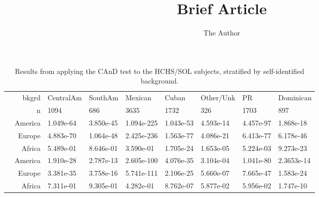 \documentclass[11pt]{article} %
\title{Brief Article}
\author{The Author}
\begin{document}
\begin{table}[ht]
\centering
\begin{tabular}{rr|lllllll}
  \hline
 &bkgrd & CentralAm & SouthAm & Mexican & Cuban & Other/Unk & PR & Dominican \\ 
  &n & 1094 &  686 & 3635 & 1732 &  326 & 1703 &  897 \\ \hline
\parbox[t]{2mm}{}&  America &  1.049e-64 &  3.850e-45 & 1.094e-225 &  1.043e-53 &  4.593e-14 &  4.457e-97 &  1.868e-18 \\ 
&  Europe&  4.883e-70 &  1.064e-48 & 2.425e-236 &  1.563e-77 &  4.086e-21 &  6.413e-77 &  6.178e-46 \\ 
 & Africa & 5.489e-01 & 8.646e-01 & 3.590e-01 & 1.705e-24 & 1.653e-05 & 5.224e-03 & 9.273e-23 \\  \hline
\parbox[t]{2mm}{}& America &  1.910e-28 &  2.787e-13 & 2.605e-100 &  4.076e-35 &  3.104e-04 &  1.041e-80 &  2.3653e-14 \\ 
  &Europe &  3.381e-35 &  3.758e-16 & 5.741e-111 &  2.106e-25 &  5.660e-07 &  7.665e-47 &  1.583e-24 \\ 
  &Africa & 7.311e-01 & 9.305e-01 & 4.282e-01 & 8.762e-07 & 5.877e-02 & 5.956e-02 & 1.747e-10 \\ 
   \hline
\end{tabular}
\caption{Results from applying the CAnD test to the HCHS/SOL subjects, stratified by self-identified background.}
\end{table}
\end{document}
